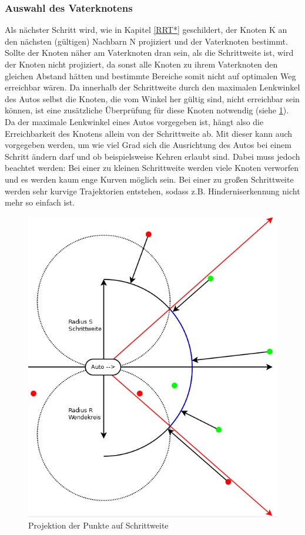 \subsubsection{Auswahl des Vaterknotens}
\label{sec:Auswahl}
Als nächster Schritt wird, wie in Kapitel \ref{RRT*} geschildert, der Knoten K an den nächsten (gültigen) Nachbarn N projiziert und der Vaterknoten bestimmt. Sollte der Knoten näher am Vaterknoten dran sein, als die Schrittweite ist, wird der Knoten nicht projiziert, da sonst alle Knoten zu ihrem Vaterknoten den gleichen Abstand hätten und bestimmte Bereiche somit nicht auf optimalen Weg erreichbar wären. Da innerhalb der Schrittweite durch den maximalen Lenkwinkel des Autos selbst die Knoten, die vom Winkel her gültig sind, nicht erreichbar sein können, ist eine zusätzliche Überprüfung für diese Knoten notwendig (siehe \ref{fig:fig5}). \\
Da der maximale Lenkwinkel eines Autos vorgegeben ist, hängt also die Erreichbarkeit des Knotens allein von der Schrittweite ab. Mit dieser kann auch vorgegeben werden, um wie viel Grad sich die Ausrichtung des Autos bei einem Schritt ändern darf und ob beispielsweise Kehren erlaubt sind. Dabei muss jedoch beachtet werden: Bei einer zu kleinen Schrittweite werden viele Knoten verworfen und es werden kaum enge Kurven möglich sein. Bei einer zu großen Schrittweite werden sehr kurvige Trajektorien entstehen, sodass z.B. Hinderniserkennung nicht mehr so einfach ist.
\begin{figure}
\centering
\label{fig:fig5}
\includegraphics[scale=0.6]{Bilder/Projektion_der_Punkte.png} 
\caption{Projektion der Punkte auf Schrittweite}
\end{figure}
